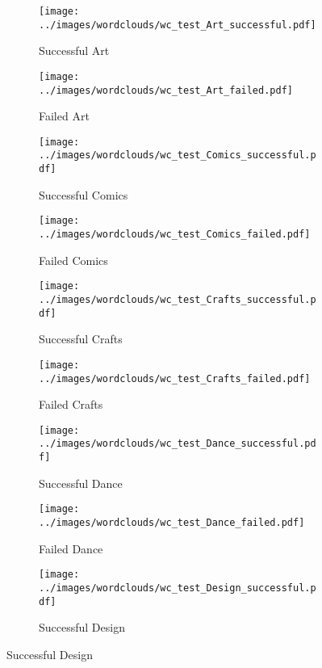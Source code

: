 \documentclass{article}
\begin{document}
{\begin{figure}
  \begin{subfigure}[a]{0.2\linewidth}
    \centering\texttt{[image: ../images/wordclouds/wc\_test\_Art\_successful.pdf]}
    \caption{Successful Art}
    \label{fig:Art_s_test}
  \end{subfigure}
  \begin{subfigure}[a']{0.2\linewidth}
    \centering\texttt{[image: ../images/wordclouds/wc\_test\_Art\_failed.pdf]}
    \caption{Failed Art}
    \label{fig:Art_f_test}
  \end{subfigure}
  \begin{subfigure}[b]{0.2\linewidth}
    \centering\texttt{[image: ../images/wordclouds/wc\_test\_Comics\_successful.pdf]}
    \caption{Successful Comics}
    \label{fig:Comic_s_test}
  \end{subfigure} 
  \begin{subfigure}[b']{0.2\linewidth}
    \centering\texttt{[image: ../images/wordclouds/wc\_test\_Comics\_failed.pdf]}
    \caption{Failed Comics}
    \label{fig:Comic_f_test}
  \end{subfigure}
  \begin{subfigure}[c]{0.2\linewidth}
    \centering\texttt{[image: ../images/wordclouds/wc\_test\_Crafts\_successful.pdf]}
    \caption{Successful Crafts}
    \label{fig:Crafts_s_test}
  \end{subfigure}
    \begin{subfigure}[c']{0.2\linewidth}
    \centering\texttt{[image: ../images/wordclouds/wc\_test\_Crafts\_failed.pdf]}
    \caption{Failed Crafts}
    \label{fig:Crafts_f_test}
  \end{subfigure}
    \begin{subfigure}[d]{0.2\linewidth}
    \centering\texttt{[image: ../images/wordclouds/wc\_test\_Dance\_successful.pdf]}
    \caption{Successful Dance}
    \label{fig:Dance_s_test}
  \end{subfigure}
    \begin{subfigure}[d']{0.2\linewidth}
    \centering\texttt{[image: ../images/wordclouds/wc\_test\_Dance\_failed.pdf]}
    \caption{Failed Dance}
    \label{fig:Dance_f_test}
   \end{subfigure}
    \begin{subfigure}[e]{0.2\linewidth}
    \centering\texttt{[image: ../images/wordclouds/wc\_test\_Design\_successful.pdf]}
    \caption{Successful Design}

\end{subfigure}
\end{figure}}
\end{document}
